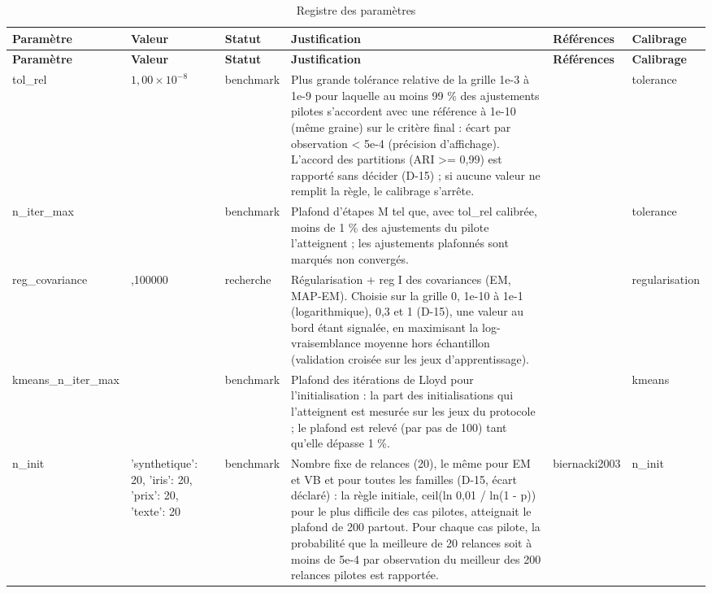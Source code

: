 {\tiny
\setlength{\tabcolsep}{3pt}
\begin{longtable}{>{\raggedright\arraybackslash}p{2.55cm}>{\raggedright\arraybackslash}p{2.55cm}>{\raggedright\arraybackslash}p{2.55cm}>{\raggedright\arraybackslash}p{2.55cm}>{\raggedright\arraybackslash}p{2.55cm}>{\raggedright\arraybackslash}p{2.55cm}}
\caption{Registre des paramètres}\label{tab:registre_parametres}\\
\toprule
\textbf{Paramètre} & \textbf{Valeur} & \textbf{Statut} & \textbf{Justification} & \textbf{Références} & \textbf{Calibrage} \\
\midrule
\endfirsthead
\toprule
\textbf{Paramètre} & \textbf{Valeur} & \textbf{Statut} & \textbf{Justification} & \textbf{Références} & \textbf{Calibrage} \\
\midrule
\endhead
\bottomrule
\endfoot
tol\_rel & $1{,}00 \times 10^{-8}$ & benchmark & Plus grande tolérance relative de la grille 1e-3 à 1e-9 pour laquelle au moins 99 \% des ajustements pilotes s'accordent avec une référence à 1e-10 (même graine) sur le critère final : écart par observation < 5e-4 (précision d'affichage). L'accord des partitions (ARI >= 0,99) est rapporté sans décider (D-15) ; si aucune valeur ne remplit la règle, le calibrage s'arrête. &  & tolerance \\
n\_iter\_max & 1800 & benchmark & Plafond d'étapes M tel que, avec tol\_rel calibrée, moins de 1 \% des ajustements du pilote l'atteignent ; les ajustements plafonnés sont marqués non convergés. &  & tolerance \\
reg\_covariance & 0,100000 & recherche & Régularisation + reg I des covariances (EM, MAP-EM). Choisie sur la grille 0, 1e-10 à 1e-1 (logarithmique), 0,3 et 1 (D-15), une valeur au bord étant signalée, en maximisant la log-vraisemblance moyenne hors échantillon (validation croisée sur les jeux d'apprentissage). &  & regularisation \\
kmeans\_n\_iter\_max & 100 & benchmark & Plafond des itérations de Lloyd pour l'initialisation : la part des initialisations qui l'atteignent est mesurée sur les jeux du protocole ; le plafond est relevé (par pas de 100) tant qu'elle dépasse 1 \%. &  & kmeans \\
n\_init & {'synthetique': 20, 'iris': 20, 'prix': 20, 'texte': 20} & benchmark & Nombre fixe de relances (20), le même pour EM et VB et pour toutes les familles (D-15, écart déclaré) : la règle initiale, ceil(ln 0,01 / ln(1 - p)) pour le plus difficile des cas pilotes, atteignait le plafond de 200 partout. Pour chaque cas pilote, la probabilité que la meilleure de 20 relances soit à moins de 5e-4 par observation du meilleur des 200 relances pilotes est rapportée. & biernacki2003 & n\_init \\

\end{longtable}}
